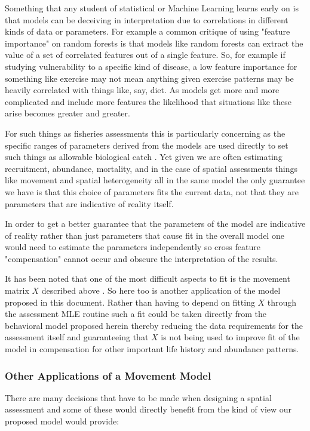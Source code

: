 \documentclass[11pt]{article}
\begin{document}
Something that any student of statistical or Machine Learning learns early on is that models can be deceiving in interpretation due to correlations in different kinds of data or parameters. For example a common critique of using "feature importance" on random forests is that models like random forests can extract the value of a set of correlated features out of a single feature. So, for example if studying vulnerability to a specific kind of disease, a low feature importance for something like exercise may not mean anything given exercise patterns may be heavily correlated with things like, say, diet. As models get more and more complicated and include more features the likelihood that situations like these arise becomes greater and greater. 

For such things as fisheries assessments this is particularly concerning as the specific ranges of parameters derived from the models are used directly to set such things as allowable biological catch \citep{king}. Yet given we are often estimating recruitment, abundance, mortality, and in the case of spatial assessments things like movement and spatial heterogeneity all in the same model the only guarantee we have is that this choice of parameters fits the current data, not that they are parameters that are indicative of reality itself. 

In order to get a better guarantee that the parameters of the model are indicative of reality rather than just parameters that cause fit in the overall model one would need to estimate the parameters independently so cross feature "compensation" cannot occur and obscure the interpretation of the results. 

It has been noted that one of the most difficult aspects to fit is the movement matrix $X$ described above \citep{punt2019}. So here too is another application of the model proposed in this document. Rather than having to depend on fitting $X$ through the assessment MLE routine such a fit could be taken directly from the behavioral model proposed herein thereby reducing the data requirements for the assessment itself and guaranteeing that $X$ is not being used to improve fit of the model in compensation for other important life history and abundance patterns. 

\subsubsection{Other Applications of a Movement Model}

There are many decisions that have to be made when designing a spatial assessment \citep{cadrin2020} \citep{goethel2023} and some of these would directly benefit from the kind of view our proposed model would provide:
\end{document}

